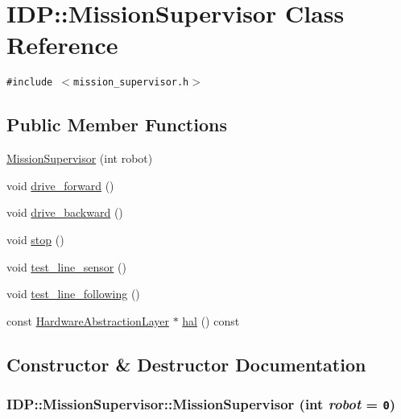 \hypertarget{classIDP_1_1MissionSupervisor}{
\section{IDP::MissionSupervisor Class Reference}
\label{classIDP_1_1MissionSupervisor}
}
{\tt \#include $<$mission\_\-supervisor.h$>$}

\subsection*{Public Member Functions}
\begin{CompactItemize}
\item 
\hyperlink{classIDP_1_1MissionSupervisor_fc6a54e04718d919b2b48458a47304b2}{MissionSupervisor} (int robot)
\item 
void \hyperlink{classIDP_1_1MissionSupervisor_f8c6a3073190a4479211753fe5f50a36}{drive\_\-forward} ()
\item 
void \hyperlink{classIDP_1_1MissionSupervisor_e5d6e9a37417126da780583349b48d44}{drive\_\-backward} ()
\item 
void \hyperlink{classIDP_1_1MissionSupervisor_d11e444b6be1d51c3339bd6397d45fd4}{stop} ()
\item 
void \hyperlink{classIDP_1_1MissionSupervisor_f147b0bec9464bb7e956a40a7f3d0fda}{test\_\-line\_\-sensor} ()
\item 
void \hyperlink{classIDP_1_1MissionSupervisor_21be0b52e2f13c7fb373c90dae77ba23}{test\_\-line\_\-following} ()
\item 
const \hyperlink{classIDP_1_1HardwareAbstractionLayer}{HardwareAbstractionLayer} $\ast$ \hyperlink{classIDP_1_1MissionSupervisor_e19d0c2123fda158cc45e649128fbc09}{hal} () const 
\end{CompactItemize}


\subsection{Constructor \& Destructor Documentation}
\hypertarget{classIDP_1_1MissionSupervisor_fc6a54e04718d919b2b48458a47304b2}{
\subsubsection[{MissionSupervisor}]{\setlength{\rightskip}{0pt plus 5cm}IDP::MissionSupervisor::MissionSupervisor (int {\em robot} = {\tt 0})}}
\label{classIDP_1_1MissionSupervisor_fc6a54e04718d919b2b48458a47304b2}


